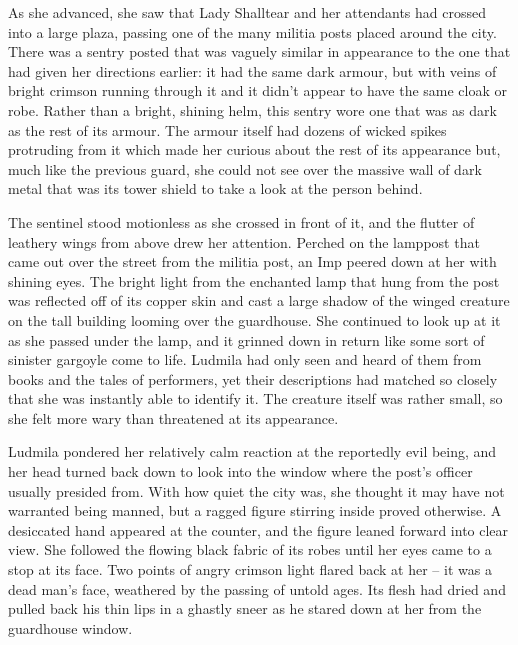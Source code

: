  

As she advanced, she saw that Lady Shalltear and her attendants had crossed into a large plaza, passing one of the many militia posts placed around the city. There was a sentry posted that was vaguely similar in appearance to the one that had given her directions earlier: it had the same dark armour, but with veins of bright crimson running through it and it didn’t appear to have the same cloak or robe. Rather than a bright, shining helm, this sentry wore one that was as dark as the rest of its armour. The armour itself had dozens of wicked spikes protruding from it which made her curious about the rest of its appearance but, much like the previous guard, she could not see over the massive wall of dark metal that was its tower shield to take a look at the person behind.

 

The sentinel stood motionless as she crossed in front of it, and the flutter of leathery wings from above drew her attention. Perched on the lamppost that came out over the street from the militia post, an Imp peered down at her with shining eyes. The bright light from the enchanted lamp that hung from the post was reflected off of its copper skin and cast a large shadow of the winged creature on the tall building looming over the guardhouse. She continued to look up at it as she passed under the lamp, and it grinned down in return like some sort of sinister gargoyle come to life. Ludmila had only seen and heard of them from books and the tales of performers, yet their descriptions had matched so closely that she was instantly able to identify it. The creature itself was rather small, so she felt more wary than threatened at its appearance.

 

Ludmila pondered her relatively calm reaction at the reportedly evil being, and her head turned back down to look into the window where the post’s officer usually presided from. With how quiet the city was, she thought it may have not warranted being manned, but a ragged figure stirring inside proved otherwise. A desiccated hand appeared at the counter, and the figure leaned forward into clear view. She followed the flowing black fabric of its robes until her eyes came to a stop at its face. Two points of angry crimson light flared back at her – it was a dead man’s face, weathered by the passing of untold ages. Its flesh had dried and pulled back his thin lips in a ghastly sneer as he stared down at her from the guardhouse window.

